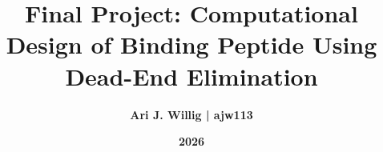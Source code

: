\title{\textbf{Final Project: Computational Design of Binding Peptide Using Dead-End Elimination}\\[2em]}


\author{\textbf{Ari J. Willig | ajw113} \\[1em]}


\date{\textbf{2026}}
\maketitle \thispagestyle{empty}
\newpage
